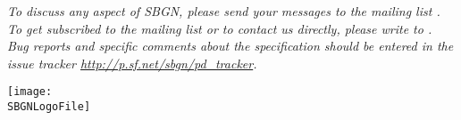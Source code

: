 \begin{titlepage}
\begin{center}

\vfill

\normalsize
\begin{minipage}{5in}
  \emph{To discuss any aspect of SBGN, please send your messages
    to the mailing list .  To get
    subscribed to the mailing list or to contact us directly,
    please write to . Bug reports and specific comments about the specification should be entered in the issue tracker \url{http://p.sf.net/sbgn/pd_tracker}.}
\end{minipage}

\vfill

\centerline{\texttt{[image: \\SBGNLogoFile]}}

\end{center}

\end{titlepage}

%
%

\setcounter{page}{2}


